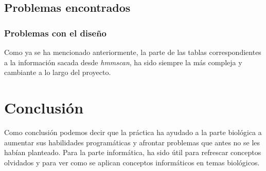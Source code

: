 \documentclass[11pt]{article} %
\begin{document}
\subsection{Problemas encontrados}

\subsubsection{Problemas con el dise\~no}

Como ya se ha mencionado anteriormente, la parte de las tablas correspondientes a la informaci\'on sacada desde \emph{hmmscan}, ha sido siempre la m\'as compleja y cambiante a lo largo del proyecto.

\section{Conclusi\'on}

Como conclusi\'on podemos decir que la pr\'actica ha ayudado a la parte biol\'ogica a aumentar sus habilidades program\'aticas y afrontar problemas que antes no se les hab\'ian planteado. Para la parte inform\'atica, ha sido \'util para refrescar conceptos olvidados y para ver como se aplican conceptos inform\'aticos en temas biol\'ogicos.
\end{document}

